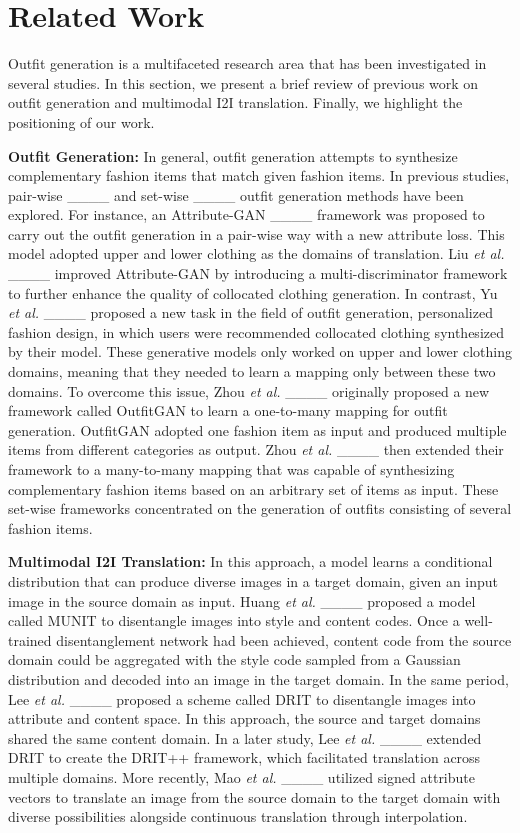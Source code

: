 \section{Related Work}
\label{sec:bg}
	
	Outfit generation is a multifaceted research area that has been investigated in several studies. In this section, we present a brief review of previous work on outfit generation and multimodal I2I translation. Finally, we highlight the positioning of our work. 
	
	\textbf{Outfit Generation:} In general, outfit generation attempts to synthesize complementary fashion items that match given fashion items. In previous studies, pair-wise ____ and set-wise ____ outfit generation methods have been explored. For instance, an Attribute-GAN ____ framework was proposed to carry out the outfit generation in a pair-wise way with a new attribute loss. This model adopted upper and lower clothing as the domains of translation. Liu \textit{et al.} ____ improved Attribute-GAN by introducing a multi-discriminator framework to further enhance the quality of collocated clothing generation. In contrast, Yu \textit{et al.} ____ proposed a new task in the field of outfit generation, personalized fashion design, in which users were recommended collocated clothing synthesized by their model. These generative models only worked on upper and lower clothing domains, meaning that they needed to learn a mapping only between these two domains. To overcome this issue, Zhou \textit{et al.} ____ originally proposed a new framework called OutfitGAN to learn a one-to-many mapping for outfit generation. OutfitGAN adopted one fashion item as input and produced multiple items from different categories as output. Zhou \textit{et al.} ____ then extended their framework to a many-to-many mapping that was capable of synthesizing complementary fashion items based on an arbitrary set of items as input. These set-wise frameworks concentrated on the generation of outfits consisting of several fashion items.
	
	\textbf{Multimodal I2I Translation:} In this approach, a model learns a conditional distribution that can produce diverse images in a target domain, given an input image in the source domain as input. Huang \textit{et al.} ____ proposed a model called MUNIT to disentangle images into style and content codes. Once a well-trained disentanglement network had been achieved, content code from the source domain could be aggregated with the style code sampled from a Gaussian distribution and decoded into an image in the target domain. In the same period, Lee \textit{et al.} ____ proposed a scheme called DRIT to disentangle images into attribute and content space. In this approach, the source and target domains shared the same content domain. In a later study, Lee \textit{et al.} ____ extended DRIT to create the DRIT++ framework, which facilitated translation across multiple domains. More recently, Mao \textit{et al.} ____ utilized signed attribute vectors to translate an image from the source domain to the target domain with diverse possibilities alongside continuous translation through interpolation.
	
